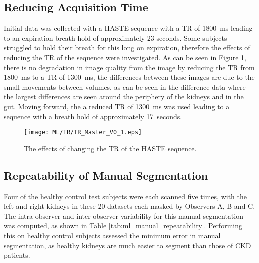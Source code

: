 \subsection{Reducing Acquisition Time}
Initial data was collected with a \ac{HASTE} sequence with a \ac{TR} of 1800~ms leading to an expiration breath hold of approximately 23 seconds. Some subjects struggled to hold their breath for this long on expiration, therefore the effects of reducing the \ac{TR} of the sequence were investigated. As can be seen in Figure \ref{fig:ml_tr}, there is no degradation in image quality from the image by reducing the \ac{TR} from 1800~ms to a \ac{TR} of 1300~ms, the differences between these images are due to the small movements between volumes, as can be seen in the difference data where the largest differences are seen around the periphery of the kidneys and in the gut. Moving forward, the a reduced \ac{TR} of 1300~ms was used leading to a sequence with a breath hold of approximately 17~seconds.

\begin{figure}[H]
	\centering
	\texttt{[image: ML/TR/TR\_Master\_V0\_1.eps]}
	\caption{The effects of changing the \ac{TR} of the \ac{HASTE} sequence.}
	\label{fig:ml_tr}	
\end{figure}

\subsection{Repeatability of Manual Segmentation}
Four of the healthy control test subjects were each scanned five times, with the left and right kidneys in these 20 datasets each masked by Observers A, B and C. The intra-observer and inter-observer variability for this manual segmentation was computed, as shown in Table \ref{tab:ml_manual_repeatability}. Performing this on healthy control subjects assessed the minimum error in manual segmentation, as healthy kidneys are much easier to segment than those of \ac{CKD} patients.

